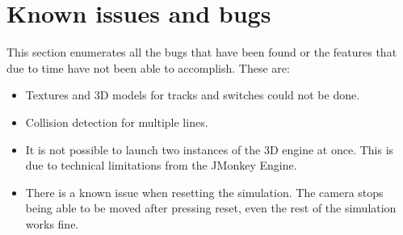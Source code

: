 \section{Known issues and bugs}

This section enumerates all the bugs that have been found or the features that due to time have not been able to accomplish. These are:

\begin{itemize}
	\item Textures and 3D models for tracks and switches could not be done.
	\item Collision detection for multiple lines.
	\item It is not possible to launch two instances of the 3D engine at once. This is due to technical limitations from the JMonkey Engine.
	\item There is a known issue when resetting the simulation. The camera stops being able to be moved after pressing reset, even the rest of the simulation works fine.
\end{itemize}